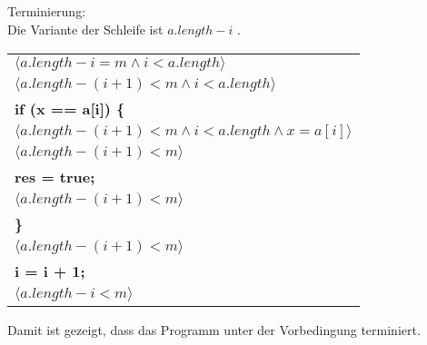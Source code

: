 \documentclass[12pt]{article}
\begin{document}
\subsection{}
\begin{center}
    Terminierung:\\
    Die Variante der Schleife ist $a.length - i$ .
    \bigbreak
    \begin{tabular}{l}
        $\langle a.length - i = m \land i < a.length \rangle$\\
        $\langle a.length - (i+1) < m \land i < a.length \rangle$\\
        \quad \textbf{if (x == a[i]) \{}\\
        \quad \quad$\langle a.length - (i+1) < m \land i < a.length \land x = a[i] \rangle$\\
        \quad \quad$\langle a.length - (i+1) < m \rangle$\\
        \quad \quad \quad \textbf{res = true;}\\
        \quad \quad$\langle a.length - (i+1) < m \rangle$\\
        \quad \textbf{\}}\\
        $\langle a.length - (i+1) < m \rangle$\\
        \quad \textbf{i = i + 1;}\\
        $\langle a.length - i < m \rangle$\\
    \end{tabular}
    \bigbreak
    Damit ist gezeigt, dass das Programm unter der Vorbedingung terminiert.
\end{center}
\end{document}
